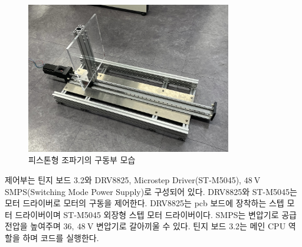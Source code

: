 \begin{figure}[H]
    \centering
        \includegraphics[width=0.8\textwidth]{images/jopagi.jpg} 
    \caption{피스톤형 조파기의 구동부 모습}
    \label{wavemaker-photo}
\end{figure}



제어부는 틴지 보드 3.2와 DRV8825, Microstep Driver(ST-M5045), $48\mathrm{~V}$ SMPS(Switching Mode Power Supply)로 구성되어 있다. DRV8825와 ST-M5045는 모터 드라이버로 모터의 구동을 제어한다. DRV8825는 pcb 보드에 장착하는 스텝 모터 드라이버이며 ST-M5045 외장형 스텝 모터 드라이버이다. SMPS는 변압기로 공급 전압을 높여주며 $36, ~48~\mathrm{V}$ 변압기로 갈아끼울 수 있다. 틴지 보드 3.2는 메인 CPU 역할을 하며 코드를 실행한다.

